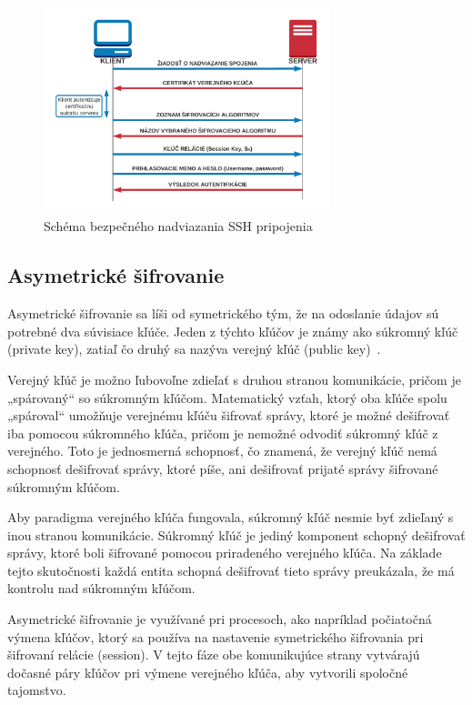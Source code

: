 \begin{figure}[H]
\begin{center}\includegraphics[width=\textwidth,height=6cm,keepaspectratio=true]{assets/symmetric_ssh.png}\end{center}
\caption[Schéma bezpečného nadviazania SSH pripojenia]{Schéma bezpečného nadviazania SSH pripojenia}\label{fig:obr_7}
\end{figure}

\subsection{Asymetrické šifrovanie}\label{subsec:asymetricke-sifrovanie}

Asymetrické šifrovanie sa líši od symetrického tým, že na odoslanie údajov sú potrebné dva súvisiace kľúče.
Jeden z týchto kľúčov je známy ako súkromný kľúč (private key), zatiaľ čo druhý sa nazýva verejný kľúč (public key)~\cite{SshEncryption}.

Verejný kľúč je možno ľubovoľne zdieľať s druhou stranou komunikácie, pričom je „spárovaný“ so súkromným kľúčom.
Matematický vzťah, ktorý oba kľúče spolu „spároval“ umožňuje verejnému kľúču šifrovať správy, ktoré je možné dešifrovať
iba pomocou súkromného kľúča, pričom je nemožné odvodiť súkromný kľúč z verejného.
Toto je jednosmerná schopnosť, čo znamená, že verejný kľúč nemá schopnosť dešifrovať správy, ktoré píše, ani dešifrovať
prijaté správy šifrované súkromným kľúčom.

Aby paradigma verejného kľúča fungovala, súkromný kľúč nesmie byť zdieľaný s inou stranou komunikácie.
Súkromný kľúč je jediný komponent schopný dešifrovať správy, ktoré boli šifrované pomocou priradeného verejného kľúča.
Na základe tejto skutočnosti každá entita schopná dešifrovať tieto správy preukázala, že má kontrolu nad súkromným kľúčom.

Asymetrické šifrovanie je využívané pri procesoch, ako napríklad počiatočná výmena kľúčov, ktorý sa používa na nastavenie
symetrického šifrovania pri šifrovaní relácie (session).
V tejto fáze obe komunikujúce strany vytvárajú dočasné páry kľúčov pri výmene verejného kľúča, aby vytvorili spoločné tajomstvo.

